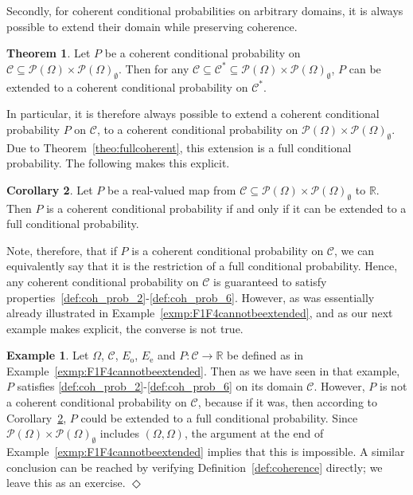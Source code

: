 \documentclass[10pt,a4paper]{paper}
\theoremstyle{definition}
\newtheorem{exmp}{Example}%
\newtheorem{theorem}{Theorem}[section]
\newtheorem{corollary}[theorem]{Corollary}
\newcommand{\reals}{\mathbb{R}}
\newcommand{\paths}{\Omega}
\newcommand{\power}{\mathcal{P}(\paths)}
\newcommand{\nonemptypower}{\power_{\emptyset}}
\newcommand{\exampleend}{\hfill$\Diamond$}
\begin{document}
Secondly, for coherent conditional probabilities on arbitrary domains, it is always possible to extend their domain while preserving coherence.

\begin{theorem}{\cite[Theorem 4]{regazzini1985finitely}}\label{theo:largerdomain}
Let $P$ be a coherent conditional probability on $\mathcal{C}\subseteq\power\times\nonemptypower$. Then for any $\mathcal{C}\subseteq\mathcal{C}^*\subseteq\power\times\nonemptypower$, $P$ can be extended to a coherent conditional probability on $\mathcal{C}^*$.
\end{theorem}
In particular, it is therefore always possible to extend a coherent conditional probability $P$ on $\mathcal{C}$, to a coherent conditional probability on $\power\times\nonemptypower$. Due to Theorem~\ref{theo:fullcoherent}, this extension is a full conditional probability. The following makes this explicit.

\begin{corollary}\label{corol:coherentextendable}
Let $P$ be a real-valued map from $\mathcal{C}\subseteq\power\times\nonemptypower$ to $\reals$. Then $P$ is a coherent conditional probability if and only if it can be extended to a full conditional probability.
\end{corollary}
Note, therefore, that if $P$ is a coherent conditional probability on $\mathcal{C}$, we can equivalently say that it is the restriction of a full conditional probability. Hence, any coherent conditional probability on $\mathcal{C}$ is guaranteed to satisfy properties~\ref{def:coh_prob_2}-\ref{def:coh_prob_6}. However, as was essentially already illustrated in Example~\ref{exmp:F1F4cannotbeextended}, and as our next example makes explicit, the converse is not true.

\begin{exmp}
Let $\Omega$, $\mathcal{C}$, $E_{\mathrm{o}}$, $E_{\mathrm{e}}$ and $P\colon\mathcal{C}\to\reals$ be defined as in Example~\ref{exmp:F1F4cannotbeextended}. Then as we have seen in that example, $P$ satisfies \ref{def:coh_prob_2}-\ref{def:coh_prob_6} on its domain $\mathcal{C}$. However, $P$ is not a coherent conditional probability on $\mathcal{C}$, because if it was, then according to Corollary~\ref{corol:coherentextendable}, $P$ could be extended to a full conditional probability. Since $\power\times\nonemptypower$ includes $(\Omega,\Omega)$, the argument at the end of Example~\ref{exmp:F1F4cannotbeextended} implies that this is impossible.
A similar conclusion can be reached by verifying Definition~\ref{def:coherence} directly; we leave this as an exercise.
\exampleend
\end{exmp}
\end{document}
